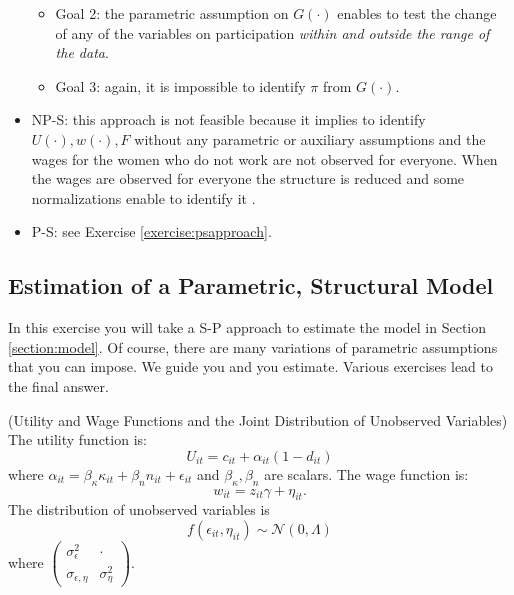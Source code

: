 \begin{exercise}
\begin{itemize}
\begin{itemize}
\item Goal 2: the parametric assumption on $G(\cdot)$ enables to test the change of any of the variables on participation \emph{within and outside the range of the data}.
\item Goal 3: again, it is impossible to identify $\pi$ from $G(\cdot)$.
\end{itemize}
\item NP-S: this approach is not feasible because it implies to identify $U(\cdot), w(\cdot), F$ without any parametric or auxiliary assumptions and the wages for the women who do not work are not observed for everyone. When the wages are observed for everyone the structure is reduced and some normalizations enable to identify it \citep[see][]{matzkin1993nonparametric}.
\item P-S: see Exercise \ref{exercise:psapproach}.
\end{itemize}
\end{exercise}

\subsection{Estimation of a Parametric, Structural Model}
In this exercise you will take a S-P approach to estimate the model in Section \ref{section:model}. Of course, there are many variations of parametric assumptions that you can impose. We guide you and you estimate. Various exercises lead to the final answer. 

\begin{assumption} (Utility and Wage Functions and the Joint Distribution of Unobserved Variables) \label{assumption:utwajo}
The utility function is:
\begin{equation}
U_{it} = c_{it} + \alpha_{it} (1 - d_{it})
\end{equation}
\noindent where $\alpha_{it} = \beta_{\kappa} \kappa_{it} + \beta_{n} n_{it} + \epsilon_{it}$ and $\beta_{\kappa},\beta_{n}$ are scalars. The wage function is:
\begin{equation}
w_{it} = z_{it} \gamma + \eta_{it}.
\end{equation}
\noindent The distribution of unobserved variables is
\begin{equation}
f \left( \epsilon_{it}, \eta_{it} \right) \sim \mathcal{N} \left( 0, \Lambda \right)
\end{equation}
where $\left( \begin{array}{cc} 
\sigma_{\epsilon}^2 & \cdot \\
\sigma_{\epsilon, \eta} & \sigma_{\eta}^2
\end{array} \right)$.  
\end{assumption}


